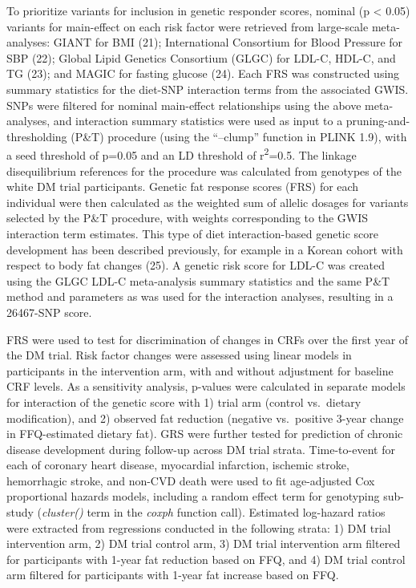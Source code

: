 \documentclass[]{article}
\begin{document}
To prioritize variants for inclusion in genetic responder scores,
nominal (p \textless{} 0.05) variants for main-effect on each risk
factor were retrieved from large-scale meta-analyses: GIANT for BMI
(21); International Consortium for Blood Pressure for SBP (22); Global
Lipid Genetics Consortium (GLGC) for LDL-C, HDL-C, and TG (23); and
MAGIC for fasting glucose (24). Each FRS was constructed using summary
statistics for the diet-SNP interaction terms from the associated GWIS.
SNPs were filtered for nominal main-effect relationships using the above
meta-analyses, and interaction summary statistics were used as input to
a pruning-and-thresholding (P\&T) procedure (using the ``--clump''
function in PLINK 1.9), with a seed threshold of p=0.05 and an LD
threshold of r\textsuperscript{2}=0.5. The linkage disequilibrium
references for the procedure was calculated from genotypes of the white
DM trial participants. Genetic fat response scores (FRS) for each
individual were then calculated as the weighted sum of allelic dosages
for variants selected by the P\&T procedure, with weights corresponding
to the GWIS interaction term estimates. This type of diet
interaction-based genetic score development has been described
previously, for example in a Korean cohort with respect to body fat
changes (25). A genetic risk score for LDL-C was created using the GLGC
LDL-C meta-analysis summary statistics and the same P\&T method and
parameters as was used for the interaction analyses, resulting in a
26467-SNP score.

FRS were used to test for discrimination of changes in CRFs over the
first year of the DM trial. Risk factor changes were assessed using
linear models in participants in the intervention arm, with and without
adjustment for baseline CRF levels. As a sensitivity analysis, p-values
were calculated in separate models for interaction of the genetic score
with 1) trial arm (control vs.~dietary modification), and 2) observed
fat reduction (negative vs.~positive 3-year change in FFQ-estimated
dietary fat). GRS were further tested for prediction of chronic disease
development during follow-up across DM trial strata. Time-to-event for
each of coronary heart disease, myocardial infarction, ischemic stroke,
hemorrhagic stroke, and non-CVD death were used to fit age-adjusted Cox
proportional hazards models, including a random effect term for
genotyping sub-study (\emph{cluster()} term in the \emph{coxph} function
call). Estimated log-hazard ratios were extracted from regressions
conducted in the following strata: 1) DM trial intervention arm, 2) DM
trial control arm, 3) DM trial intervention arm filtered for
participants with 1-year fat reduction based on FFQ, and 4) DM trial
control arm filtered for participants with 1-year fat increase based on
FFQ.
\end{document}
